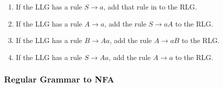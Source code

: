 \documentclass{article}
\theoremstyle{definition}
\begin{document}
\begin{enumerate}
\item If the LLG has a rule $S \to a$, add that rule in to the RLG.
\item If the LLG has a rule $A \to a$, add the rule $S \to aA$ to the RLG.
\item If the LLG has a rule $B \to Aa$, add the rule $A \to aB$ to the RLG.
\item If the LLG has a rule $S \to Aa$, add the rule $A \to a$ to the RLG.
\end{enumerate}

\subsubsection*{Regular Grammar to NFA}
\end{document}
